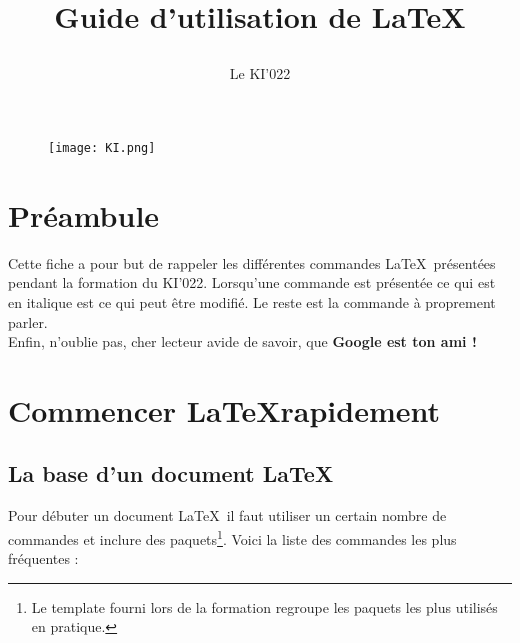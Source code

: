 \documentclass[11pt]{article}				%
\title{\textbf{Guide d'utilisation de \LaTeX}
\author{Le KI'022}
\date{}
}
\begin{document}
\maketitle

\begin{figure}[h]
\begin{center}
\texttt{[image: KI.png]}
\end{center}
\end{figure}

\section*{Préambule}

Cette fiche a pour but de rappeler les différentes commandes \LaTeX \ présentées pendant la formation du KI'022. Lorsqu'une commande est présentée ce qui est en italique est ce qui peut être modifié. Le reste est la commande à proprement parler. \\
Enfin, n'oublie pas, cher lecteur avide de savoir, que \textbf{Google est ton ami !}

\tableofcontents



\newpage


\section{Commencer \LaTeX rapidement}
\subsection{La base d'un document \LaTeX}


\noindent Pour débuter un document \LaTeX \ il faut utiliser un certain nombre de commandes et inclure des paquets\footnote{Le template fourni lors de la formation regroupe les paquets les plus utilisés en pratique.}. Voici la liste des commandes les plus fréquentes : \\
\end{document}

